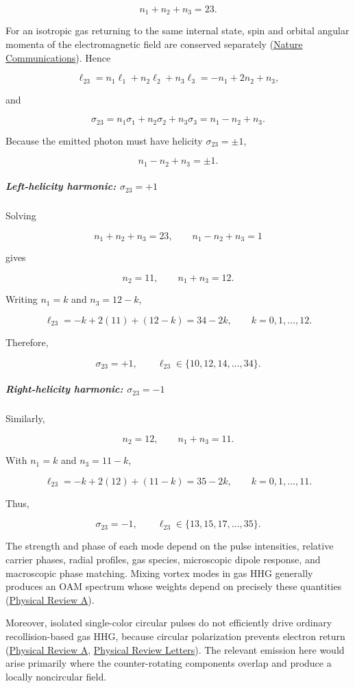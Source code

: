 \[
n_1+n_2+n_3=23.
\]

For an isotropic gas returning to the same internal state, spin and orbital angular momenta of the electromagnetic field are conserved separately (\href{\detokenize{https://pmc.ncbi.nlm.nih.gov/articles/PMC11317519/}}{Nature Communications}). Hence

\[
\ell_{23}=n_1\ell_1+n_2\ell_2+n_3\ell_3 =-n_1+2n_2+n_3,
\]

and

\[
\sigma_{23} =n_1\sigma_1+n_2\sigma_2+n_3\sigma_3 =n_1-n_2+n_3.
\]

Because the emitted photon must have helicity $\sigma_{23}=\pm1$,

\[
n_1-n_2+n_3=\pm1.
\]

\subparagraph*{Left-helicity harmonic: $\sigma_{23}=+1$}

Solving

\[
n_1+n_2+n_3=23,\qquad n_1-n_2+n_3=1
\]

gives

\[
n_2=11,\qquad n_1+n_3=12.
\]

Writing $n_1=k$ and $n_3=12-k$,

\[
\ell_{23} =-k+2(11)+(12-k) =34-2k, \qquad k=0,1,\ldots,12.
\]

Therefore,

\[
{ \sigma_{23}=+1,\qquad \ell_{23}\in\{10,12,14,\ldots,34\}. }
\]

\subparagraph*{Right-helicity harmonic: $\sigma_{23}=-1$}

Similarly,

\[
n_2=12,\qquad n_1+n_3=11.
\]

With $n_1=k$ and $n_3=11-k$,

\[
\ell_{23} =-k+2(12)+(11-k) =35-2k, \qquad k=0,1,\ldots,11.
\]

Thus,

\[
{ \sigma_{23}=-1,\qquad \ell_{23}\in\{13,15,17,\ldots,35\}. }
\]

The strength and phase of each mode depend on the pulse intensities, relative carrier phases, radial profiles, gas species, microscopic dipole response, and macroscopic phase matching. Mixing vortex modes in gas HHG generally produces an OAM spectrum whose weights depend on precisely these quantities (\href{\detokenize{https://journals.aps.org/pra/abstract/10.1103/PhysRevA.105.023107}}{Physical Review A}).

Moreover, isolated single-color circular pulses do not efficiently drive ordinary recollision-based gas HHG, because circular polarization prevents electron return (\href{\detokenize{https://journals.aps.org/pra/abstract/10.1103/PhysRevA.48.R3437}}{Physical Review A}, \href{\detokenize{https://link.aps.org/accepted/10.1103/PhysRevLett.119.063201}}{Physical Review Letters}). The relevant emission here would arise primarily where the counter-rotating components overlap and produce a locally noncircular field.
